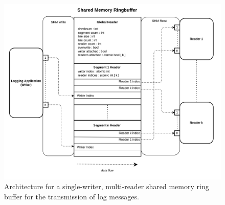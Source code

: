 \begin{figure}[h!]
    \includegraphics[width=\textwidth]{images/shm_architecture.png}
    \caption[Shared Memory Architecture]{Architecture for a single-writer, multi-reader shared memory ring buffer for the transmission
    of log messages.}
    \label{fig:shm_architecture}
\end{figure}

